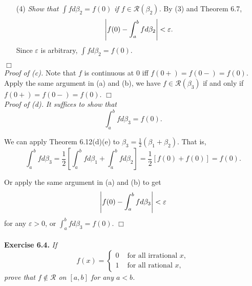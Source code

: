 \documentclass{article}
\begin{document}
\begin{enumerate}
\item[(4)]
  \emph{Show that $\int f d\beta_2 = f(0)$ if $f \in \mathscr{R}(\beta_2)$.}
  By (3) and Theorem 6.7,
  \[
    \abs{ f(0) - \int_{a}^{b} f d\beta_2 } < \varepsilon.
  \]
  Since $\varepsilon$ is arbitrary, $\int f d\beta_2 = f(0)$.
\end{enumerate}
$\Box$ \\



\emph{Proof of (c).}
Note that $f$ is continuous at $0$ iff $f(0+) = f(0-) = f(0)$.
Apply the same argument in (a) and (b),
we have $f \in \mathscr{R}(\beta_3)$ if and only if $f(0+) = f(0-) = f(0)$.
$\Box$ \\



\emph{Proof of (d).}
\emph{It suffices to show that
\[
  \int_{a}^{b} f d\beta_3 = f(0).
\]}

We can apply Theorem 6.12(d)(e) to $\beta_3 = \frac{1}{2}(\beta_1+\beta_2)$.
That is,
\[
  \int_{a}^{b} f d\beta_3
  = \frac{1}{2}\left[ \int_{a}^{b} f d\beta_1 + \int_{a}^{b} f d\beta_2 \right]
  = \frac{1}{2}[f(0) + f(0)] = f(0).
\]

Or apply the same argument in (a) and (b) to get
\[
  \abs{ f(0) - \int_{a}^{b} f d\beta_3 } < \varepsilon
\]
for any $\varepsilon > 0$, or $\int_{a}^{b} f d\beta_3 = f(0)$.
$\Box$ \\\\






\textbf{Exercise 6.4.}
\emph{If
\begin{equation*}
  f(x) =
    \begin{cases}
      0 & \text{ for all irrational $x$}, \\
      1 & \text{ for all rational $x$},
    \end{cases}
\end{equation*}
prove that $f \not\in \mathscr{R}$ on $[a,b]$ for any $a < b$.} \\
\end{document}
